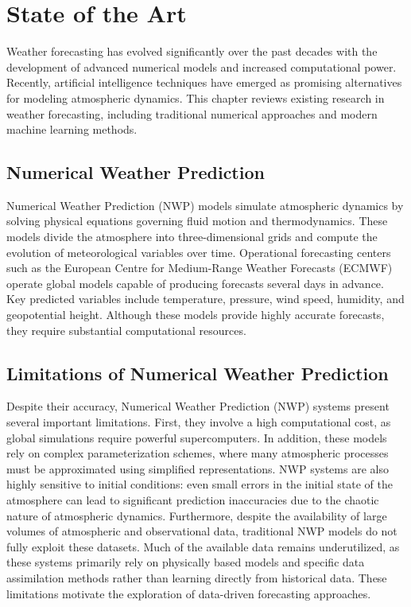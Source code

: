 \chapter{State of the Art}
\label{chap:State of the Art}

Weather forecasting has evolved significantly over the past decades with the development of advanced numerical models and increased computational power. Recently, artificial intelligence techniques have emerged as promising alternatives for modeling atmospheric dynamics.
This chapter reviews existing research in weather forecasting, including traditional numerical approaches and modern machine learning methods.

\section{Numerical Weather Prediction}
Numerical Weather Prediction (NWP) models simulate atmospheric dynamics by solving physical equations governing fluid motion and thermodynamics. These models divide the atmosphere into three-dimensional grids and compute the evolution of meteorological variables over time. Operational forecasting centers such as the European Centre for Medium-Range Weather Forecasts (ECMWF) operate global models capable of producing forecasts several days in advance. Key predicted variables include temperature, pressure, wind speed, humidity, and geopotential height. Although these models provide highly accurate forecasts, they require substantial computational resources.
\section{Limitations of Numerical Weather Prediction}
Despite their accuracy, Numerical Weather Prediction (NWP) systems present several important limitations. First, they involve a high computational cost, as global simulations require powerful supercomputers. In addition, these models rely on complex parameterization schemes, where many atmospheric processes must be approximated using simplified representations. NWP systems are also highly sensitive to initial conditions: even small errors in the initial state of the atmosphere can lead to significant prediction inaccuracies due to the chaotic nature of atmospheric dynamics. Furthermore, despite the availability of large volumes of atmospheric and observational data, traditional NWP models do not fully exploit these datasets. Much of the available data remains underutilized, as these systems primarily rely on physically based models and specific data assimilation methods rather than learning directly from historical data. These limitations motivate the exploration of data-driven forecasting approaches.
